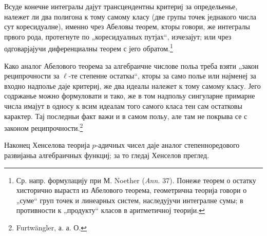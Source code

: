 ﻿\documentclass[11pt]{article}
\begin{document}
Всуде конечне интегралы дајут трансцендентны критериј за определьенье, належет ли два полигона к тому самому класу (две групы точек једнакого числа сут коресидуалне), именно чрез Абеловы теорем, кторы говори, же интегралы првого рода, протегнуте по „коресидуалных путјах“, изчезајут; или чрез одговарјајучи диференциалны теорем с јего обратом.\footnote{Ср. напр. формулацију при М. Noether (\emph{Ann.} 37). Понеже теорем о остатку хисторично вырастл из Абелового теорема, геометрична теорија говори о „суме“ груп точек и линеарных систем, наследујучи интегралне сумы; в противности к „продукту“ класов в аритметичној теорији.}

Како аналог Абелового теорема за алгебраичне числове польа треба взяти „закон реципрочности за \(\ell\)-те степенне остаткы“, кторы за само полье или најменеј за входно надполье даје критериј, же два идеалы належет к тому самому класу. Јего содржанье можно формуловати и тако, же в том надпольу сингуларне примарне числа имајут в односу к всим идеалам того самого класа тен сам остатковы карактер. Тај последньи факт важи и в самом польу, але там не покрыва се с законом реципрочности.\footnote{Furtwängler, а. а. О.}

Наконец Хенселова теорија \(p\)-адичных чисел даје аналог степенноредового развијаньа алгебраичных функциј; за то гледај Хенселов преглед.
\end{document}
